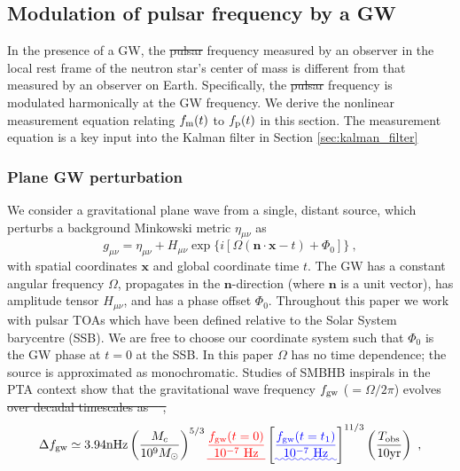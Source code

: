 \documentclass[fleqn,usenatbib,useAMS]{mnras}
\providecommand{\DIFadd}[1]{{\protect\color{blue}\uwave{#1}}} %
\providecommand{\DIFdel}[1]{{\protect\color{red}\sout{#1}}}                      %
\providecommand{\DIFaddbegin}{} %
\providecommand{\DIFaddend}{} %
\providecommand{\DIFdelbegin}{} %
\providecommand{\DIFdelend}{} %
\newcommand{\DIFscaledelfig}{0.5}
\newlength{\DIFdelgraphicswidth} %
\newlength{\DIFdelgraphicsheight} %
\newcommand{\DIFaddincludegraphics}[2][]{{\color{blue}\fbox{\DIFOincludegraphics[#1]{#2}}}} %
\newcommand{\DIFdelincludegraphics}[2][]{%
\sbox{\DIFdelgraphicsbox}{\DIFOincludegraphics[#1]{#2}}%
\settoboxwidth{\DIFdelgraphicswidth}{\DIFdelgraphicsbox} %
\settoboxtotalheight{\DIFdelgraphicsheight}{\DIFdelgraphicsbox} %
\scalebox{\DIFscaledelfig}{%
\parbox[b]{\DIFdelgraphicswidth}{\usebox{\DIFdelgraphicsbox}\\[-\baselineskip] \rule{\DIFdelgraphicswidth}{0em}}\llap{\resizebox{\DIFdelgraphicswidth}{\DIFdelgraphicsheight}{%
\setlength{\unitlength}{\DIFdelgraphicswidth}%
\begin{picture}(1,1)%
\thicklines\linethickness{2pt} %
{\color[rgb]{1,0,0}\put(0,0){\framebox(1,1){}}}%
{\color[rgb]{1,0,0}\put(0,0){\line( 1,1){1}}}%
{\color[rgb]{1,0,0}\put(0,1){\line(1,-1){1}}}%
\end{picture}%
}\hspace*{3pt}}} %
} %
\DeclareRobustCommand{\DIFaddbegin}{\DIFOaddbegin \let\includegraphics\DIFaddincludegraphics} %
\DeclareRobustCommand{\DIFaddend}{\DIFOaddend \let\includegraphics\DIFOincludegraphics} %
\DeclareRobustCommand{\DIFdelbegin}{\DIFOdelbegin \let\includegraphics\DIFdelincludegraphics} %
\DeclareRobustCommand{\DIFdelend}{\DIFOaddend \let\includegraphics\DIFOincludegraphics} %
\begin{document}
\subsection{Modulation of pulsar frequency by a GW} \label{sec:psr_measured}
In the presence of a GW, the \DIFdelbegin \DIFdel{pulsar }\DIFdelend \DIFaddbegin \DIFadd{pulse }\DIFaddend frequency measured by an observer in the local rest frame of the neutron star's center of mass is different from that measured by an observer on Earth. Specifically, the \DIFdelbegin \DIFdel{pulsar }\DIFdelend \DIFaddbegin \DIFadd{pulse }\DIFaddend frequency is modulated harmonically at the GW frequency. We derive the nonlinear measurement equation relating $f_{\rm m}(t)$ to $f_{\rm p}(t)$ in this section. The measurement equation is a key input into the Kalman filter in Section \eqref{sec:kalman_filter}
\subsubsection{Plane GW perturbation}\label{sec:plane_gw}
We consider a gravitational plane wave from a single, distant source, which perturbs a background Minkowski metric $\eta_{\mu \nu}$ as
\begin{equation}
	g_{\mu \nu} = \eta_{\mu \nu} + H_{\mu \nu} \exp{ \{ i[\Omega(\boldsymbol{n} \cdot \boldsymbol{x} - t) + \Phi_0] \} } \ ,
\end{equation}
with spatial coordinates $\boldsymbol{x}$ and global coordinate time $t$. The GW has a constant angular frequency $\Omega$, propagates in the $\boldsymbol{n}$-direction (where $\boldsymbol{n}$ is a unit vector), has amplitude tensor $H_{\mu \nu}$, and has a phase offset  $\Phi_0$. Throughout this paper we work with pulsar TOAs which have been defined relative to the Solar System barycentre (SSB). We are free to choose our coordinate system such that $\Phi_0$ is the GW phase at $t=0$ at the SSB. In this paper $\Omega$ has no time dependence; the source is approximated as monochromatic. Studies of SMBHB inspirals in the PTA context show that the gravitational wave frequency $f_{\rm gw}$ ($=\Omega / 2 \pi $) evolves \DIFdelbegin \DIFdel{over decadal timescales as \mbox{%
\citep[e.g.][]{Zhu10}}\hskip0pt%
,
}\DIFdelend \DIFaddbegin \DIFadd{according to \mbox{%
\citep[e.g.][]{Zhu10}}\hskip0pt%
,
}\DIFaddend \begin{equation}
	\Delta f_{\rm gw} \simeq 3.94 \mathrm{nHz}\left(\frac{M_c}{10^9 M_{\odot}}\right)^{5 / 3}\DIFdelbegin %
\DIFdel{\frac{f_{\rm gw}(t=0)}{10^{-7} \mathrm{~Hz}}}%
\DIFdelend \DIFaddbegin \left[\DIFadd{\frac{f_{\rm gw}(t=t_1)}{10^{-7} \mathrm{~Hz}}}\right]\DIFaddend ^{11 / 3}\left(\frac{T_{\mathrm{obs}}}{10 \mathrm{yr}}\right) \ ,
	\label{eq:f_evolution}
\end{equation}
\end{document}
